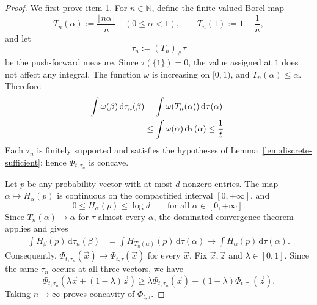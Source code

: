 \documentclass[aps,pra,11pt,onecolumn,nofootinbib,tightenlines]{revtex4-2}
\theoremstyle{definition}
\begin{document}
\begin{proof}
We first prove item 1. For $n\in\mathbb N$, define the finite-valued Borel map
\begin{equation}
 T_n(\alpha):=\frac{\lfloor n\alpha\rfloor}{n}
 \quad(0\leq\alpha<1),
 \qquad
 T_n(1):=1-\frac1n,
 \label{eq:positive-quantizer}
\end{equation}
 and let
\begin{equation}
 \tau_n:=(T_n)_\#\tau
 \label{eq:pushforward-tau-n}
\end{equation}
be the push-forward measure. Since $\tau(\{1\})=0$, the value assigned at $1$ does not affect any integral. The function $\omega$ is increasing on $[0,1)$, and $T_n(\alpha)\leq\alpha$. Therefore
\begin{align}
 \int\omega(\beta)\,\mathrm d\tau_n(\beta)
 &=\int\omega(T_n(\alpha))\,\mathrm d\tau(\alpha)\notag\\
 &\leq\int\omega(\alpha)\,\mathrm d\tau(\alpha)
 \leq\frac1t.
 \label{eq:quantizer-moment-preservation}
\end{align}
Each $\tau_n$ is finitely supported and satisfies the hypotheses of Lemma~\ref{lem:discrete-sufficient}; hence $\Phi_{t,\tau_n}$ is concave.

Let $p$ be any probability vector with at most $d$ nonzero entries. The map $\alpha\mapsto H_\alpha(p)$ is continuous on the compactified interval $[0,+\infty]$, and
\begin{equation}
 0\leq H_\alpha(p)\leq\log d
 \qquad\text{for all }\alpha\in[0,+\infty].
 \label{eq:renyi-uniform-bound}
\end{equation}
Since $T_n(\alpha)\to\alpha$ for $\tau$-almost every $\alpha$, the dominated convergence theorem applies and gives
\begin{align}
 \int H_\beta(p)\,\mathrm d\tau_n(\beta)
 &=\int H_{T_n(\alpha)}(p)\,\mathrm d\tau(\alpha)
 \longrightarrow
 \int H_\alpha(p)\,\mathrm d\tau(\alpha).
 \label{eq:common-discrete-DCT}
\end{align}
Consequently, $\Phi_{t,\tau_n}(\vec x)\to\Phi_{t,\tau}(\vec x)$ for every $\vec x$. Fix $\vec x,\vec z$ and $\lambda\in[0,1]$. Since the same $\tau_n$ occurs at all three vectors, we have
\begin{equation}
 \Phi_{t,\tau_n}(\lambda\vec x+(1-\lambda)\vec z)
 \geq
 \lambda\Phi_{t,\tau_n}(\vec x)
 +(1-\lambda)\Phi_{t,\tau_n}(\vec z).
 \label{eq:common-concavity-inequality}
\end{equation}
Taking $n\to\infty$ proves concavity of $\Phi_{t,\tau}$.


\end{proof}
\end{document}
